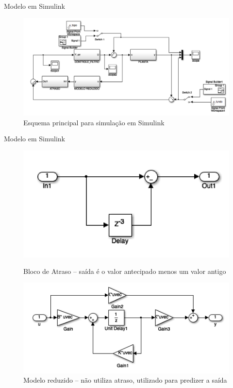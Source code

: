 \documentclass[10pt]{beamer}
\begin{document}
\begin{frame}[fragile]{Modelo em Simulink}
\begin{figure}[!ht]
\centering

\includegraphics[width=0.9\linewidth]{figures/resultados/simulink/top}
\caption{Esquema principal para simulação em Simulink\label{topModel}}
\end{figure}	
\end{frame}

\begin{frame}[fragile]{Modelo em Simulink}
 \begin{figure}[!htb]
    \centering
    \begin{minipage}{.45\textwidth}
		\centering
		\includegraphics[width=1\linewidth]{figures/resultados/simulink/atraso}
		\caption{Bloco de Atraso -- saída é o valor antecipado menos um valor antigo\label{blocoAtraso}}
    \end{minipage}%
    \hspace{0.1cm}
    \begin{minipage}{0.45\textwidth}
        \centering
		\includegraphics[width=1\linewidth]{figures/resultados/simulink/modeloReduzido}
		\caption{Modelo reduzido -- não utiliza atraso, utilizado para predizer a saída\label{blocoModeloReduzido}}
    \end{minipage}
\end{figure}
	
\end{frame}
\end{document}
